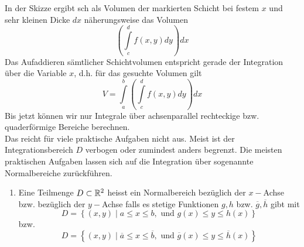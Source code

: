In der Skizze ergibt sch als Volumen der markierten Schicht bei festem $x$ und sehr kleinen Dicke $dx$ näherungsweise das Volumen \[\left( {\int\limits_c^d {f\left( {x,y} \right)dy} } \right)dx\] Das Aufaddieren sämtlicher Schichtvolumen entspricht gerade der Integration über die Variable $x$, d.h. für das gesuchte Volumen gilt \[V = \int\limits_a^b {\left( {\int\limits_c^d {f\left( {x,y} \right)dy} } \right)dx} \]
Bis jetzt können wir nur Integrale über achsenparallel rechteckige bzw. quaderförmige Bereiche berechnen.\\

Das reicht für viele praktische Aufgaben nicht aus. Meist ist der Integrationsbereich $D$ verbogen oder zumindest anders begrenzt.
Die meisten praktischen Aufgaben lassen sich auf die Integration über sogenannte Normalbereiche zurückführen.

\begin{definition}{9.10}
\begin{enumerate}
\item Eine Teilmenge $D\subset\mathbb{R}^2$ heisst ein Normalbereich bezüglich der $x-$Achse bzw. bezüglich der $y-$Achse falls es stetige Funktionen $g,h$ bzw. $\overline{g},\overline{h}$ gibt mit
\[D=\left\{ \left( x,y\right)\mid a\leq x\leq b,\text{ und }g(x)\leq y\leq h(x)\right\}\]
bzw.
\[D=\left\{ \left( x,y\right)\mid \overline{a}\leq x\leq \overline{b},\text{ und }\overline{g}(x)\leq y\leq \overline{h}(x)\right\}\]
\end{enumerate}
\end{definition}

